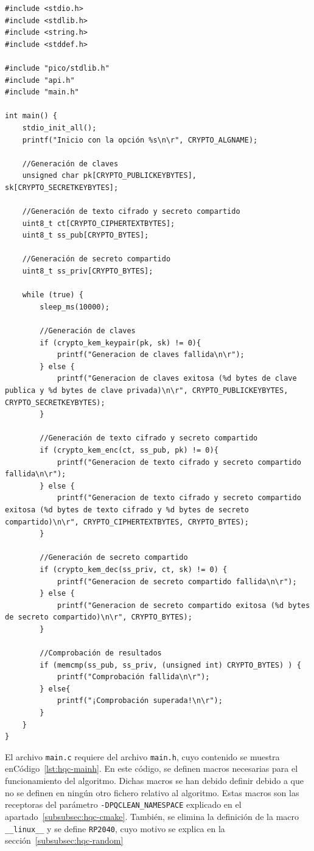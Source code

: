 \begin{lstlisting}[label={lst:hqc-main},style=Cnice,firstnumber=1,caption={Archivo \texttt{HQC-128/main.c}.}]
#include <stdio.h>
#include <stdlib.h>
#include <string.h>
#include <stddef.h>

#include "pico/stdlib.h"
#include "api.h"
#include "main.h"

int main() {
    stdio_init_all();
    printf("Inicio con la opción %s\n\r", CRYPTO_ALGNAME);

    //Generación de claves
    unsigned char pk[CRYPTO_PUBLICKEYBYTES], sk[CRYPTO_SECRETKEYBYTES];

    //Generación de texto cifrado y secreto compartido
    uint8_t ct[CRYPTO_CIPHERTEXTBYTES];
    uint8_t ss_pub[CRYPTO_BYTES];

    //Generación de secreto compartido
    uint8_t ss_priv[CRYPTO_BYTES];

    while (true) {
        sleep_ms(10000);

        //Generación de claves
        if (crypto_kem_keypair(pk, sk) != 0){
            printf("Generacion de claves fallida\n\r");
        } else {
            printf("Generacion de claves exitosa (%d bytes de clave publica y %d bytes de clave privada)\n\r", CRYPTO_PUBLICKEYBYTES, CRYPTO_SECRETKEYBYTES);
        }

        //Generación de texto cifrado y secreto compartido
        if (crypto_kem_enc(ct, ss_pub, pk) != 0){
            printf("Generacion de texto cifrado y secreto compartido fallida\n\r");
        } else {
            printf("Generacion de texto cifrado y secreto compartido exitosa (%d bytes de texto cifrado y %d bytes de secreto compartido)\n\r", CRYPTO_CIPHERTEXTBYTES, CRYPTO_BYTES);
        }

        //Generación de secreto compartido
        if (crypto_kem_dec(ss_priv, ct, sk) != 0) {
            printf("Generacion de secreto compartido fallida\n\r");
        } else {
            printf("Generacion de secreto compartido exitosa (%d bytes de secreto compartido)\n\r", CRYPTO_BYTES);
        }

        //Comprobación de resultados
        if (memcmp(ss_pub, ss_priv, (unsigned int) CRYPTO_BYTES) ) {
            printf("Comprobación fallida\n\r");
        } else{
            printf("¡Comprobación superada!\n\r");
        }
    }
}
\end{lstlisting}

El archivo \texttt{main.c} requiere del archivo \texttt{main.h}, cuyo contenido se muestra enCódigo~\ref{lst:hqc-mainh}.
En este código, se definen macros necesarias para el funcionamiento del algoritmo.
Dichas macros se han debido definir debido a que no se definen en ningún otro fichero relativo al algoritmo.
Estas macros son las receptoras del parámetro \texttt{-DPQCLEAN\_NAMESPACE} explicado en el apartado~\ref{subsubsec:hqc-cmake}.
También, se elimina la definición de la macro \texttt{\_\_linux\_\_} y se define \texttt{RP2040}, cuyo motivo se explica en la sección~\ref{subsubsec:hqc-random}

